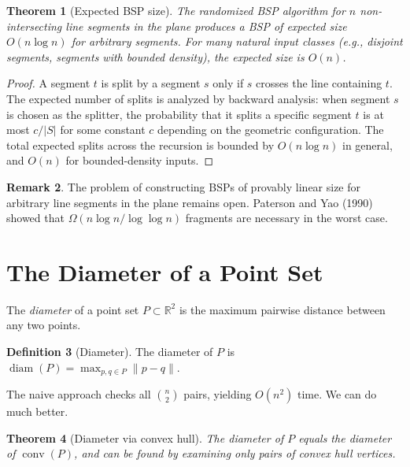 \documentclass[twoside,12pt]{book}
\theoremstyle{plain}
\newtheorem{theorem}{Theorem}[chapter]
\theoremstyle{definition}
\newtheorem{definition}[theorem]{Definition}
\newtheorem{remark}[theorem]{Remark}
\theoremstyle{remark}
\begin{document}
\begin{theorem}[Expected BSP size]
\label{thm:bsp-size}
The randomized BSP algorithm for $n$ non-intersecting line segments in the plane produces a BSP of expected size $O(n \log n)$ for arbitrary segments. For many natural input classes (e.g., disjoint segments, segments with bounded density), the expected size is $O(n)$.
\end{theorem}

\begin{proof}
A segment $t$ is split by a segment $s$ only if $s$ crosses the line containing $t$. The expected number of splits is analyzed by backward analysis: when segment $s$ is chosen as the splitter, the probability that it splits a specific segment $t$ is at most $c / |S|$ for some constant $c$ depending on the geometric configuration. The total expected splits across the recursion is bounded by $O(n \log n)$ in general, and $O(n)$ for bounded-density inputs.
\end{proof}

\begin{remark}
The problem of constructing BSPs of provably linear size for arbitrary line segments in the plane remains open. Paterson and Yao (1990) showed that $\Omega(n \log n / \log \log n)$ fragments are necessary in the worst case.
\end{remark}

\section{The Diameter of a Point Set}
\label{sec:diameter}

The \emph{diameter} of a point set $P \subset \mathbb{R}^2$ is the maximum pairwise distance between any two points.

\begin{definition}[Diameter]
The diameter of $P$ is $\operatorname{diam}(P) = \max_{p, q \in P} \|p - q\|$.
\end{definition}

The naive approach checks all $\binom{n}{2}$ pairs, yielding $O(n^2)$ time. We can do much better.

\begin{theorem}[Diameter via convex hull]
\label{thm:diameter-hull}
The diameter of $P$ equals the diameter of $\operatorname{conv}(P)$, and can be found by examining only pairs of convex hull vertices.
\end{theorem}
\end{document}
